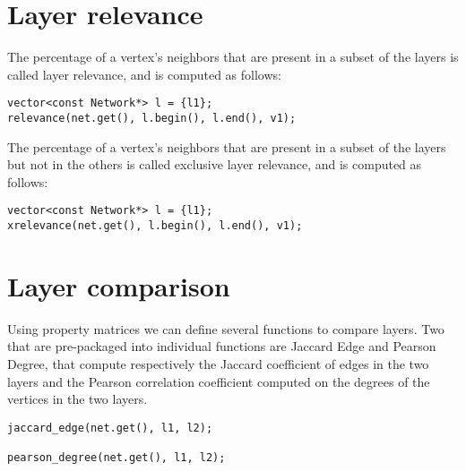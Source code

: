 \section{Layer relevance}

The percentage of a vertex's neighbors that are present in a subset of the layers is called layer relevance, and is computed as follows:
\begin{lstlisting}[style=c++]
vector<const Network*> l = {l1};
relevance(net.get(), l.begin(), l.end(), v1);
\end{lstlisting}

The percentage of a vertex's neighbors that are present in a subset of the layers but not in the others is called exclusive layer relevance, and is computed as follows:
\begin{lstlisting}[style=c++]
vector<const Network*> l = {l1};
xrelevance(net.get(), l.begin(), l.end(), v1);
\end{lstlisting}

\section{Layer comparison}

Using property matrices we can define several functions to compare layers. Two that are pre-packaged into individual functions are Jaccard Edge and Pearson Degree, that compute respectively the Jaccard coefficient of edges in the two layers and the Pearson correlation coefficient computed on the degrees of the vertices in the two layers.
\begin{lstlisting}[style=c++]
jaccard_edge(net.get(), l1, l2);

pearson_degree(net.get(), l1, l2);
\end{lstlisting}
